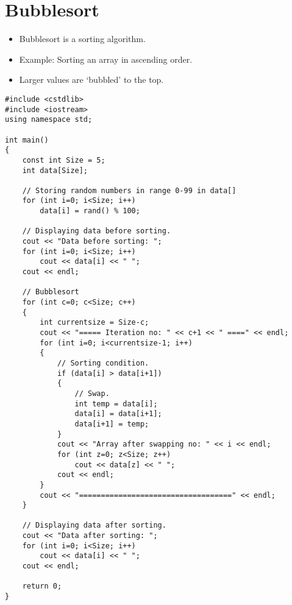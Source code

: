 \documentclass[12pt,a4paper]{article}
\begin{document}
\section{Bubblesort}
\begin{itemize}
\item Bubblesort is a sorting algorithm.
\item Example: Sorting an array in ascending order.
\item Larger values are `bubbled' to the top.
\end{itemize}
\begin{lstlisting}[caption={Bubble Sort}]
#include <cstdlib>
#include <iostream>
using namespace std;

int main()
{
	const int Size = 5;
	int data[Size];

	// Storing random numbers in range 0-99 in data[]
	for (int i=0; i<Size; i++)
		data[i] = rand() % 100;
		
	// Displaying data before sorting.
	cout << "Data before sorting: ";
	for (int i=0; i<Size; i++)
		cout << data[i] << " ";
	cout << endl;

	// Bubblesort
	for (int c=0; c<Size; c++)
	{
		int currentsize = Size-c;
		cout << "===== Iteration no: " << c+1 << " ====" << endl;
		for (int i=0; i<currentsize-1; i++)
		{
			// Sorting condition.
			if (data[i] > data[i+1])
			{
				// Swap.
				int temp = data[i];
				data[i] = data[i+1];
				data[i+1] = temp;
			}
			cout << "Array after swapping no: " << i << endl;
			for (int z=0; z<Size; z++)
				cout << data[z] << " ";
			cout << endl;
		}
		cout << "===================================" << endl;
	}

	// Displaying data after sorting.
	cout << "Data after sorting: ";
	for (int i=0; i<Size; i++)
		cout << data[i] << " ";
	cout << endl;
	
	return 0;
}
\end{lstlisting}
%
%
\end{document}
